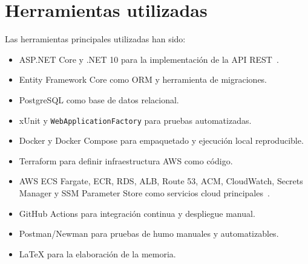 \section{Herramientas utilizadas}
\label{sec:herramientas}

Las herramientas principales utilizadas han sido:

\begin{itemize}
  \item ASP.NET Core y .NET 10 para la implementación de la API REST~\cite{MicrosoftAspNetCoreDocs}.
  \item Entity Framework Core como ORM y herramienta de migraciones.
  \item PostgreSQL como base de datos relacional.
  \item xUnit y \texttt{WebApplicationFactory} para pruebas automatizadas.
  \item Docker y Docker Compose para empaquetado y ejecución local reproducible.
  \item Terraform para definir infraestructura AWS como código.
  \item AWS ECS Fargate, ECR, RDS, ALB, Route 53, ACM, CloudWatch, Secrets Manager y SSM Parameter Store como servicios cloud principales~\cite{AwsEcsDocs,AwsRdsDocs,AwsRoute53Docs,AwsAcmDocs}.
  \item GitHub Actions para integración continua y despliegue manual.
  \item Postman/Newman para pruebas de humo manuales y automatizables.
  \item LaTeX para la elaboración de la memoria.
\end{itemize}
